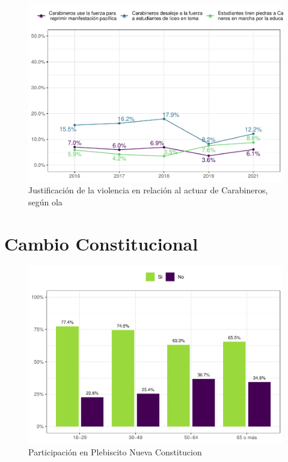 \documentclass[
  12pt,
  openany]{book}
\begin{document}
\begin{figure}

{\centering \includegraphics{reporte-elsoc_files/figure-latex/just-carab-ola-1} 

}

\caption{Justificación de la violencia en relación al actuar de Carabineros, según ola}\label{fig:just-carab-ola}
\end{figure}

\hypertarget{cambio-constitucional}{%
\chapter{Cambio Constitucional}\label{cambio-constitucional}}

\begin{figure}

{\centering \includegraphics{reporte-elsoc_files/figure-latex/particip-edad-1} 

}

\caption{Participación en Plebiscito Nueva Constitucion}\label{fig:particip-edad}
\end{figure}
\end{document}
